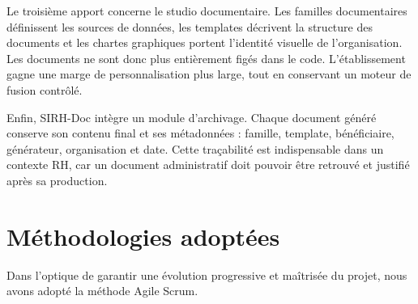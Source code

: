 Le troisième apport concerne le studio documentaire. Les familles documentaires définissent les sources de données, les templates décrivent la structure des documents et les chartes graphiques portent l'identité visuelle de l'organisation. Les documents ne sont donc plus entièrement figés dans le code. L'établissement gagne une marge de personnalisation plus large, tout en conservant un moteur de fusion contrôlé.

Enfin, SIRH-Doc intègre un module d'archivage. Chaque document généré conserve son contenu final et ses métadonnées : famille, template, bénéficiaire, générateur, organisation et date. Cette traçabilité est indispensable dans un contexte RH, car un document administratif doit pouvoir être retrouvé et justifié après sa production.

\section{Méthodologies adoptées}

Dans l’optique de garantir une évolution progressive et maîtrisée du projet, nous avons adopté la méthode Agile Scrum.

